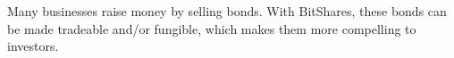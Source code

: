 Many businesses raise money by selling bonds. With BitShares, these bonds can
be made tradeable and/or fungible, which makes them more compelling to
investors.

